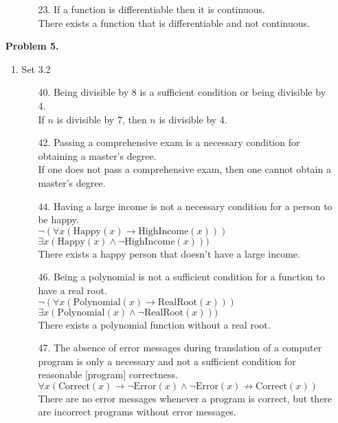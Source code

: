 \documentclass[letterpaper,fleqn]{article}
\begin{document}
\begin{enumerate}
\begin{enumerate}[]
\begin{enumerate}
				\item [23.]
				If a function is differentiable then it is continuous. \\
				There exists a function that is differentiable and not continuous.
			\end{enumerate}
		\end{enumerate}
		
		\item [] \textbf{Problem 5.}
		\begin{enumerate}[]
			\item Set 3.2
			\begin{enumerate}
				\item [40.]
				Being divisible by 8 is a sufficient condition or being divisible by 4. \\
				If $n$ is divisible by 7, then $n$ is divisible by 4.
				
				\item [42.]
				Passing a comprehensive exam is a necessary condition for obtaining a master's degree. \\
				If one does not pass a comprehensive exam, then one cannot obtain a master's degree.
				
				\item [44.]
				Having a large income is not a necessary condition for a person to be happy. \\
				$\neg(\forall x (\text{Happy}(x) \rightarrow \text{HighIncome}(x)))$ \\
				$\exists x (\text{Happy}(x) \wedge \neg \text{HighIncome}(x)))$ \\
				There exists a happy person that doesn't have a large income.
				
				\item [46.]
				Being a polynomial is not a sufficient condition for a function to have a real root. \\
				$\neg(\forall x (\text{Polynomial}(x) \rightarrow \text{RealRoot}(x)))$ \\
				$\exists x (\text{Polynomial}(x) \wedge \neg\text{RealRoot}(x)))$ \\
				There exists a polynomial function without a real root.
				
				\item [47.]
				The absence of error messages during translation of a computer program is only a necessary and not a sufficient condition for reasonable [program] correctness. \\
				$\forall x (\text{Correct}(x) \rightarrow \neg\text{Error}(x) \wedge \neg\text{Error}(x) \not\rightarrow \text{Correct}(x))$ \\
				There are no error messages whenever a program is correct, but there are incorrect programs without error messages.
				

\end{enumerate}
\end{enumerate}
\end{enumerate}
\end{document}
